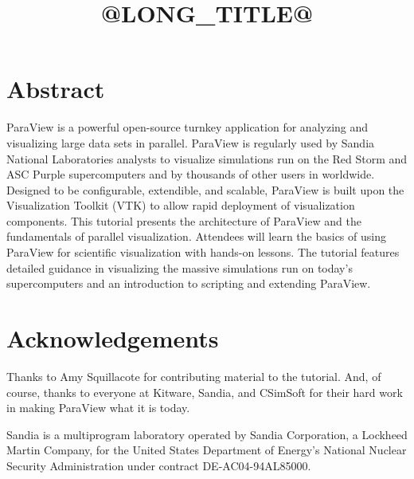 \documentclass[12pt]{book}
\title{@LONG_TITLE@}
\author{%
  \authorinfo{Kenneth~Moreland}{kmorel@sandia.gov}{Sandia~National~Laboratories}
  }
\date{}
\begin{document}
\frontmatter

\sloppy
\maketitle

\chapter*{Abstract}

ParaView is a powerful open-source turnkey application for analyzing and
visualizing large data sets in parallel.  ParaView is regularly used by
Sandia National Laboratories analysts to visualize simulations run on the
Red Storm and ASC Purple supercomputers and by thousands of other users in
worldwide.  Designed to be configurable, extendible, and scalable, ParaView
is built upon the Visualization Toolkit (VTK) to allow rapid deployment of
visualization components.  This tutorial presents the architecture of
ParaView and the fundamentals of parallel visualization.  Attendees will
learn the basics of using ParaView for scientific visualization with
hands-on lessons.  The tutorial features detailed guidance in visualizing
the massive simulations run on today’s supercomputers and an introduction
to scripting and extending ParaView.

\tableofcontents

\listofexercise

\mainmatter











\backmatter

\chapter{Acknowledgements}

Thanks to Amy Squillacote for contributing material to the tutorial.  And,
of course, thanks to everyone at Kitware, Sandia, and CSimSoft for their
hard work in making ParaView what it is today.

Sandia is a multiprogram laboratory operated by Sandia Corporation, a
Lockheed Martin Company, for the United States Department of Energy's
National Nuclear Security Administration under contract DE-AC04-94AL85000.

\clearpage
{}
{}
\printindex
\end{document}
